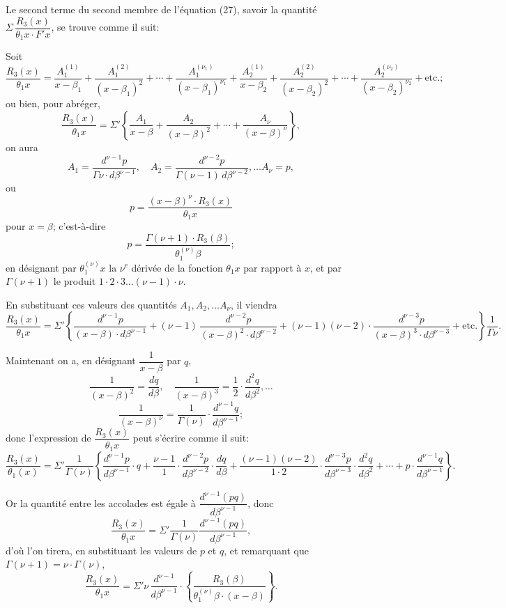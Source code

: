 \documentclass{article}
\begin{document}
Le second terme du second membre de l'équation (27), savoir la quantité $\Sigma\,\dfrac{R_3(x)}{\theta_1 x \cdot F' x}$, se trouve comme il suit:

Soit
\[ \frac{R_3(x)}{\theta_1 x} = \frac{A_1^{(1)}}{x-\beta_1} + \frac{A_1^{(2)}}{(x-\beta_1)^{2}} + \cdots + \frac{A_1^{(\nu_1)}}{(x-\beta_1)^{\nu_1}} + \frac{A_2^{(1)}}{x-\beta_2} + \frac{A_2^{(2)}}{(x-\beta_2)^{2}} + \cdots + \frac{A_2^{(\nu_2)}}{(x-\beta_2)^{\nu_2}} + \text{etc.;} \]
ou bien, pour abréger,
\[ \frac{R_3(x)}{\theta_1 x} = \Sigma' \left\{ \frac{A_1}{x-\beta} + \frac{A_2}{(x-\beta)^{2}} + \cdots + \frac{A_\nu}{(x-\beta)^{\nu}} \right\}, \]
on aura
\[ A_1 = \frac{d^{\nu-1} p}{\Gamma\nu \cdot d\beta^{\nu-1}}, \quad A_2 = \frac{d^{\nu-2} p}{\Gamma(\nu-1)\,d\beta^{\nu-2}}, \ldots A_\nu = p, \]
ou
\[ p = \frac{(x-\beta)^{\nu} \cdot R_3(x)}{\theta_1 x} \]
pour $x = \beta$; c'est-à-dire
\[ p = \frac{\Gamma(\nu+1) \cdot R_3(\beta)}{\theta_1^{(\nu)}\beta}; \]
en désignant par $\theta_1^{(\nu)} x$ la $\nu^{\text{e}}$ dérivée de la fonction $\theta_1 x$ par rapport à $x$, et par $\Gamma(\nu+1)$ le produit $1 \cdot 2 \cdot 3 \ldots (\nu-1) \cdot \nu$.

En substituant ces valeurs des quantités $A_1, A_2, \ldots A_\nu$, il viendra
\[ \frac{R_3(x)}{\theta_1 x} = \Sigma' \left\{ \frac{d^{\nu-1} p}{(x-\beta) \cdot d\beta^{\nu-1}} + (\nu-1)\,\frac{d^{\nu-2} p}{(x-\beta)^{2} \cdot d\beta^{\nu-2}} + (\nu-1)(\nu-2) \cdot \frac{d^{\nu-3} p}{(x-\beta)^{3} \cdot d\beta^{\nu-3}} + \text{etc.} \right\} \frac{1}{\Gamma\nu}. \]

Maintenant on a, en désignant $\dfrac{1}{x-\beta}$ par $q$,
\[ \frac{1}{(x-\beta)^{2}} = \frac{dq}{d\beta}, \quad \frac{1}{(x-\beta)^{3}} = \frac{1}{2} \cdot \frac{d^{2} q}{d\beta^{2}}, \ldots \]
\[ \frac{1}{(x-\beta)^{\nu}} = \frac{1}{\Gamma(\nu)} \cdot \frac{d^{\nu-1} q}{d\beta^{\nu-1}}; \]
donc l'expression de $\dfrac{R_3(x)}{\theta_1 x}$ peut s'écrire comme il suit:
\[ \frac{R_3(x)}{\theta_1(x)} = \Sigma' \frac{1}{\Gamma(\nu)} \left\{ \frac{d^{\nu-1} p}{d\beta^{\nu-1}} \cdot q + \frac{\nu-1}{1} \cdot \frac{d^{\nu-2} p}{d\beta^{\nu-2}} \cdot \frac{dq}{d\beta} + \frac{(\nu-1)(\nu-2)}{1 \cdot 2} \cdot \frac{d^{\nu-3} p}{d\beta^{\nu-3}} \cdot \frac{d^{2} q}{d\beta^{2}} + \cdots + p \cdot \frac{d^{\nu-1} q}{d\beta^{\nu-1}} \right\}. \]

Or la quantité entre les accolades est égale à $\dfrac{d^{\nu-1}(pq)}{d\beta^{\nu-1}}$, donc
\[ \frac{R_3(x)}{\theta_1 x} = \Sigma' \frac{1}{\Gamma(\nu)} \frac{d^{\nu-1}(pq)}{d\beta^{\nu-1}}, \]
d'où l'on tirera, en substituant les valeurs de $p$ et $q$, et remarquant que $\Gamma(\nu+1) = \nu \cdot \Gamma(\nu)$,
\[ \frac{R_3(x)}{\theta_1 x} = \Sigma' \nu\,\frac{d^{\nu-1}}{d\beta^{\nu-1}} \cdot \left\{ \frac{R_3(\beta)}{\theta_1^{(\nu)}\beta \cdot (x-\beta)} \right\}. \]
\end{document}
